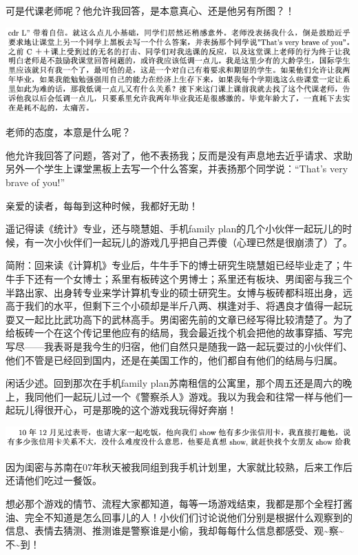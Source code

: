 \documentclass[9pt, b5paper]{article}
\begin{document}
可是代课老师呢？他允许我回答，是本意真心、还是他另有所图？！

\begin{center}
\includegraphics[width=.9\linewidth]{./pic/backups_plans_20210424_204405.png}
\end{center}

老师的态度，本意是什么呢？

他允许我回答了问题，答对了，他不表扬我；反而是没有声息地去近乎请求、求助另外一个学生上课堂黑板上去写一个什么答案，并表扬那个同学说：“That's very brave of you!”

亲爱的读者，每每到这种时候，我都好无助！

遥记得读《统计》专业，还与晓慧姐、手机family plan的几个小伙伴一起玩儿的时候，有一次小伙伴们一起玩儿的游戏几乎把自己弄傻（心理已然是很崩溃了）了。

简附：回来读《计算机》专业后，牛牛手下的博士研究生晓慧姐已经毕业走了；牛牛手下还有一个女博士；系里有板砖这个男博士；系里还有板块、男闺密与我三个半路出家、出身转专业来学计算机专业的硕士研究生。女博与板砖都科班出身，远高于我们的水平，但剩下三个小硕却是半斤八两、棋逢对手、将遇良才值得一起玩耍又一起比比武功高下的武林高手。男闺密先前的文章已经写得比较清楚了。为了给板砖一个在这个传记里他应有的结局，我会最近找个机会把他的故事穿插、写完写尽——我表哥是我今生的归宿，他们自然只是随我一路一起玩耍过的小伙伴们、他们不管是已经回到国内，还是在美国工作的，他们都自有他们的结局与归属。 

闲话少述。回到那次在手机family plan苏南租信的公寓里，那个周五还是周六的晚上，我同他们一起玩儿过一个《警察杀人》游戏。我以为我会和往常一样与他们一起玩儿得很开心，可是那晚的这个游戏我玩得好奔崩！

\begin{center}
\includegraphics[width=.9\linewidth]{./pic/backups_plans_20210425_152933.png}
\end{center}

因为闺密与苏南在07年秋天被我同组到我手机计划里，大家就比较熟，后来工作后还请他们吃过一餐饭。

想必那个游戏的情节、流程大家都知道，每等一场游戏结束，我都是那个全程打酱油、完全不知道是怎么回事儿的人！小伙们们讨论说他们分别是根据什么观察到的信息、表情去猜测、推测谁是警察谁是小偷，我却每每什么信息都感受、观\textasciitilde{}察\textasciitilde{}不\textasciitilde{}到！
\end{document}
